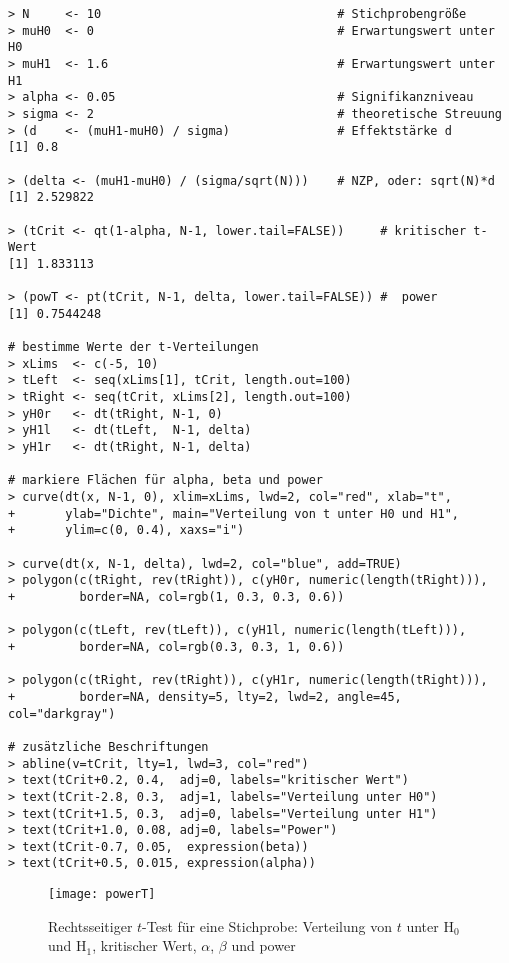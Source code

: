 \begin{lstlisting}
> N     <- 10                                 # Stichprobengröße
> muH0  <- 0                                  # Erwartungswert unter H0
> muH1  <- 1.6                                # Erwartungswert unter H1
> alpha <- 0.05                               # Signifikanzniveau
> sigma <- 2                                  # theoretische Streuung
> (d    <- (muH1-muH0) / sigma)               # Effektstärke d
[1] 0.8

> (delta <- (muH1-muH0) / (sigma/sqrt(N)))    # NZP, oder: sqrt(N)*d
[1] 2.529822

> (tCrit <- qt(1-alpha, N-1, lower.tail=FALSE))     # kritischer t-Wert
[1] 1.833113

> (powT <- pt(tCrit, N-1, delta, lower.tail=FALSE)) #  power
[1] 0.7544248

# bestimme Werte der t-Verteilungen
> xLims  <- c(-5, 10)
> tLeft  <- seq(xLims[1], tCrit, length.out=100)
> tRight <- seq(tCrit, xLims[2], length.out=100)
> yH0r   <- dt(tRight, N-1, 0)
> yH1l   <- dt(tLeft,  N-1, delta)
> yH1r   <- dt(tRight, N-1, delta)

# markiere Flächen für alpha, beta und power
> curve(dt(x, N-1, 0), xlim=xLims, lwd=2, col="red", xlab="t",
+       ylab="Dichte", main="Verteilung von t unter H0 und H1",
+       ylim=c(0, 0.4), xaxs="i")

> curve(dt(x, N-1, delta), lwd=2, col="blue", add=TRUE)
> polygon(c(tRight, rev(tRight)), c(yH0r, numeric(length(tRight))),
+         border=NA, col=rgb(1, 0.3, 0.3, 0.6))

> polygon(c(tLeft, rev(tLeft)), c(yH1l, numeric(length(tLeft))),
+         border=NA, col=rgb(0.3, 0.3, 1, 0.6))

> polygon(c(tRight, rev(tRight)), c(yH1r, numeric(length(tRight))),
+         border=NA, density=5, lty=2, lwd=2, angle=45, col="darkgray")

# zusätzliche Beschriftungen
> abline(v=tCrit, lty=1, lwd=3, col="red")
> text(tCrit+0.2, 0.4,  adj=0, labels="kritischer Wert")
> text(tCrit-2.8, 0.3,  adj=1, labels="Verteilung unter H0")
> text(tCrit+1.5, 0.3,  adj=0, labels="Verteilung unter H1")
> text(tCrit+1.0, 0.08, adj=0, labels="Power")
> text(tCrit-0.7, 0.05,  expression(beta))
> text(tCrit+0.5, 0.015, expression(alpha))
\end{lstlisting}

\begin{figure}[ht]
\centering
\texttt{[image: powerT]}
\vspace*{-1em}
\caption{Rechtsseitiger $t$-Test für eine Stichprobe: Verteilung von $t$ unter $\text{H}_{0}$ und $\text{H}_{1}$, kritischer Wert, $\alpha$, $\beta$ und power}
\label{fig:powerT}
\end{figure}

